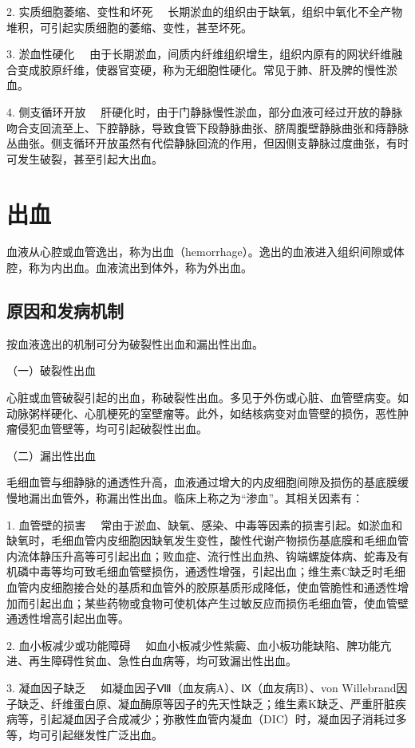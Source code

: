 {2. 实质细胞萎缩、变性和坏死}
　长期淤血的组织由于缺氧，组织中氧化不全产物堆积，可引起实质细胞的萎缩、变性，甚至坏死。

{3. 淤血性硬化}
　由于长期淤血，间质内纤维组织增生，组织内原有的网状纤维融合变成胶原纤维，使器官变硬，称为无细胞性硬化。常见于肺、肝及脾的慢性淤血。

{4. 侧支循环开放}
　肝硬化时，由于门静脉慢性淤血，部分血液可经过开放的静脉吻合支回流至上、下腔静脉，导致食管下段静脉曲张、脐周腹壁静脉曲张和痔静脉丛曲张。侧支循环开放虽然有代偿静脉回流的作用，但因侧支静脉过度曲张，有时可发生破裂，甚至引起大出血。

\section{出血}

血液从心腔或血管逸出，称为出血（hemorrhage）。逸出的血液进入组织间隙或体腔，称为内出血。血液流出到体外，称为外出血。

\subsection{原因和发病机制}

按血液逸出的机制可分为破裂性出血和漏出性出血。

{（一）破裂性出血}

心脏或血管破裂引起的出血，称破裂性出血。多见于外伤或心脏、血管壁病变。如动脉粥样硬化、心肌梗死的室壁瘤等。此外，如结核病变对血管壁的损伤，恶性肿瘤侵犯血管壁等，均可引起破裂性出血。

{（二）漏出性出血}

毛细血管与细静脉的通透性升高，血液通过增大的内皮细胞间隙及损伤的基底膜缓慢地漏出血管外，称漏出性出血。临床上称之为``渗血''。其相关因素有：

{1. 血管壁的损害}
　常由于淤血、缺氧、感染、中毒等因素的损害引起。如淤血和缺氧时，毛细血管内皮细胞因缺氧发生变性，酸性代谢产物损伤基底膜和毛细血管内流体静压升高等可引起出血；败血症、流行性出血热、钩端螺旋体病、蛇毒及有机磷中毒等均可致毛细血管壁损伤，通透性增强，引起出血；维生素C缺乏时毛细血管内皮细胞接合处的基质和血管外的胶原基质形成降低，使血管脆性和通透性增加而引起出血；某些药物或食物可使机体产生过敏反应而损伤毛细血管，使血管壁通透性增高引起出血等。

{2. 血小板减少或功能障碍}
　如血小板减少性紫癜、血小板功能缺陷、脾功能亢进、再生障碍性贫血、急性白血病等，均可致漏出性出血。

{3. 凝血因子缺乏} 　如凝血因子Ⅷ（血友病A）、Ⅸ（血友病B）、von
Willebrand因子缺乏、纤维蛋白原、凝血酶原等因子的先天性缺乏；维生素K缺乏、严重肝脏疾病等，引起凝血因子合成减少；弥散性血管内凝血（DIC）时，凝血因子消耗过多等，均可引起继发性广泛出血。

